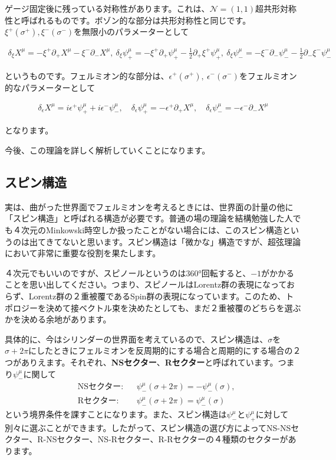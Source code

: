\documentclass[report,paper=a4, fontsize=12pt, line_length=16cm, number_of_lines=34,dvipdfmx]{jlreq}
\newenvironment{important}{\begin{tcolorbox}[
  colback = white,
  colframe = red!35,
  boxrule = 2mm,
  fonttitle = \bfseries,
  after = \noindent] }{\end{tcolorbox}}
\numberwithin{equation}{chapter}
\numberwithin{equation}{section}
\newcommand{\Ncal}{\mathcal{N}}
\newcommand{\del}{\partial}
\newcommand{\kyou}[1]{{\sffamily \bfseries #1}}
\begin{document}
ゲージ固定後に残っている対称性があります。これは、$\Ncal=(1,1)$超共形対称性と呼ばれるものです。ボゾン的な部分は共形対称性と同じです。$\xi^{+}(\sigma^{+}),\xi^{-}(\sigma^{-})$を無限小のパラメーターとして
\begin{important}
  \begin{align}
    \delta_{\xi}X^{\mu}=-\xi^{+}\del_{+}X^{\mu}-\xi^{-}\del_{-}X^{\mu},\ 
    \delta_{\xi}\psi^{\mu}_{+}=-\xi^{+}\del_{+}\psi^{\mu}_{+}-\frac12 \del_{+}\xi^{+}\psi^{\mu}_{+},\ 
    \delta_{\xi}\psi^{\mu}_{-}=-\xi^{-}\del_{-}\psi^{\mu}_{-}-\frac12 \del_{-}\xi^{-}\psi^{\mu}_{-}
  \end{align}    
\end{important}
というものです。フェルミオン的な部分は、$\epsilon^{+}(\sigma^{+}),\ \epsilon^{-}(\sigma^{-})$をフェルミオン的なパラメーターとして
\begin{important}
  \begin{align}
    \delta_{\epsilon}X^{\mu}=i\epsilon^{+}\psi^{\mu}_{+}+i\epsilon^{-}\psi^{\mu}_{-}
    ,\quad
    \delta_{\epsilon}\psi^{\mu}_{+}=-\epsilon^{+}\del_{+}X^{\mu}
    ,\quad
    \delta_{\epsilon}\psi^{\mu}_{-}=-\epsilon^{-}\del_{-}X^{\mu}
    \label{superresidualtransformation}
  \end{align}    
\end{important}
となります。

今後、この理論を詳しく解析していくことになります。

\subsection{スピン構造}

実は、曲がった世界面でフェルミオンを考えるときには、世界面の計量の他に「スピン構造」と呼ばれる構造が必要です。普通の場の理論を結構勉強した人でも４次元のMinkowski時空しか扱ったことがない場合には、このスピン構造というのは出てきてないと思います。スピン構造は「微かな」構造ですが、超弦理論において非常に重要な役割を果たします。

４次元でもいいのですが、スピノールというのは360°回転すると、$-1$がかかることを思い出してください。つまり、スピノールはLorentz群の表現になっておらず、Lorentz群の２重被覆であるSpin群の表現になっています。このため、トポロジーを決めて接ベクトル束を決めたとしても、まだ２重被覆のどちらを選ぶかを決める余地があります。

具体的に、今はシリンダーの世界面を考えているので、スピン構造は、$\sigma$を$\sigma+2\pi$にしたときにフェルミオンを反周期的にする場合と周期的にする場合の２つがありえます。それぞれ、\kyou{NSセクター}、\kyou{Rセクター}と呼ばれています。つまり$\psi^{\mu}_{-}$に関して
\begin{align}
  &\text{NSセクター:}&& \psi^{\mu}_{-}(\sigma+2\pi)=-\psi^{\mu}_{-}(\sigma),\\
  &\text{Rセクター:}&& \psi^{\mu}_{-}(\sigma+2\pi)=\psi^{\mu}_{-}(\sigma) 
\end{align}
という境界条件を課すことになります。また、スピン構造は$\psi^{\mu}_{-}$と$\psi^{\mu}_{+}$に対して別々に選ぶことができます。したがって、スピン構造の選び方によってNS-NSセクター、R-NSセクター、NS-Rセクター、R-Rセクターの４種類のセクターがあります。
\end{document}
